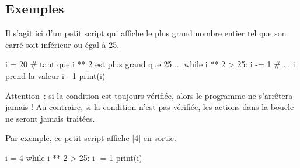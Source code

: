 	\subsection{Exemples}
	
		Il s'agit ici d'un petit script qui affiche le plus grand nombre entier tel que son carré soit inférieur ou égal à 25.
		\begin{pythoncode}
			i = 20
			# tant que i ** 2 est plus grand que 25 ...
			while i ** 2 > 25:
				i -= 1 # ... i prend la valeur i - 1
			print(i)
		\end{pythoncode}
		
		Attention~: si la condition est toujours vérifiée, alors le programme ne s'arrêtera jamais ! Au contraire, si la condition n'est pas vérifiée, les actions dans la boucle ne seront jamais traitées.
		
		Par exemple, ce petit script affiche \python|4| en sortie.
		\begin{pythoncode}
			i = 4
			while i ** 2 > 25:
				i -= 1
			print(i)
		\end{pythoncode}
